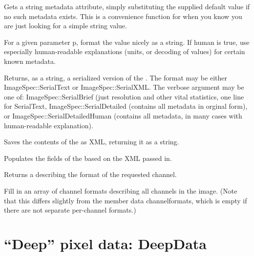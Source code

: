 Gets a string metadata attribute, simply substituting the supplied
default value if no such metadata exists.  This is a convenience
function for when you know you are just looking for a simple string value.
\apiend


For a given parameter {\cf p}, format the value nicely as a string.
If {\cf human} is true, use
especially human-readable explanations (units, or decoding of
values) for certain known metadata.
\apiend


Returns, as a string, a serialized version of the \ImageSpec.
The {\cf format} may be either {\cf ImageSpec::SerialText} or
{\cf ImageSpec::SerialXML}.
The {\cf verbose} argument may be one of: {\cf ImageSpec::SerialBrief} (just
resolution and other vital statistics, one line for {\cf SerialText},
{\cf ImageSpec::SerialDetailed} (contains all metadata in orginal form), or
{\cf ImageSpec::SerialDetailedHuman} (contains all metadata, in many cases
with human-readable explanation).

\apiend

Saves the contents of the \ImageSpec as XML, returning it as a string.
\apiend

Populates the fields of the \ImageSpec based on the XML passed in.
\apiend

Returns a \TypeDesc describing the format of the requested channel.
\apiend

Fill in an array of channel formats describing all channels in the
image.  (Note that this differs slightly from the member data 
{\cf channelformats}, which is empty if there are not separate per-channel
formats.)
\apiend



\section{``Deep'' pixel data: {\cf DeepData}}
\label{sec:deepdata}


